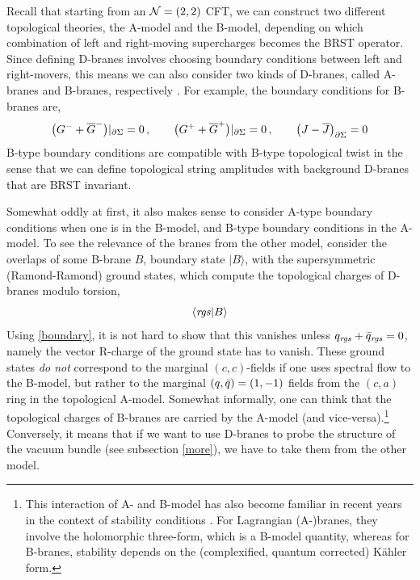 Recall that starting from an ${\cal N}=(2,2)$ CFT, we can construct two
different topological theories, the A-model and the B-model, depending
on which combination of left and right-moving supercharges becomes the 
BRST operator. Since defining D-branes involves choosing boundary 
conditions between left and right-movers, this means we can also 
consider two kinds of D-branes, called A-branes and B-branes, 
respectively \cite{oooy}. For example, the boundary conditions for 
B-branes are,
\begin{equation}
\eqlabel{boundary}
\bigl(G^-+\Gb^-\bigr)|_{\del\Sigma} = 0\,, \qquad
\bigl(G^++\Gb^+\bigr)|_{\del\Sigma}=0\,, \qquad
\bigl(J - \Jb\bigr)_{\del\Sigma}= 0
\end{equation}
B-type boundary conditions are compatible with B-type topological
twist in the sense that we can define topological string amplitudes
with background D-branes that are BRST invariant.

Somewhat oddly at first, it also makes sense to consider A-type
boundary conditions when one is in the B-model, and B-type boundary 
conditions in the A-model. To see the relevance of the branes from the 
other model, consider the overlaps of some B-brane $B$, boundary state
$|B\rangle$, with the supersymmetric (Ramond-Ramond) ground states, 
which compute the topological charges of D-branes modulo torsion,
\begin{equation}
\langle {\it rgs} | B \rangle 
\end{equation}
Using \eqref{boundary}, it is not hard to show that this vanishes
unless $q_{\it rgs}+{\bar q}_{\it rgs}=0$, namely the vector R-charge
of the ground state has to vanish. These ground states {\it do not}
correspond to the marginal $(c,c)$-fields if one uses spectral flow
to the B-model, but rather to the marginal $(q,{\bar q})=(1,-1)$ fields
from the $(c,a)$ ring in the topological A-model. Somewhat informally,
one can think that the topological charges of B-branes are carried 
by the A-model (and vice-versa).\footnote{This interaction of A-
and B-model has also become familiar in recent years in the context of 
stability conditions \cite{dougstab,bridgeland,thomasyau}. For Lagrangian 
(A-)branes, they involve the holomorphic three-form, which is a B-model 
quantity, whereas for B-branes, stability depends on the (complexified, 
quantum corrected) K\"ahler form.} Conversely, it means that if we want 
to use D-branes to probe the structure of the vacuum bundle (see subsection 
\ref{more}), we have to take them from the other model.


